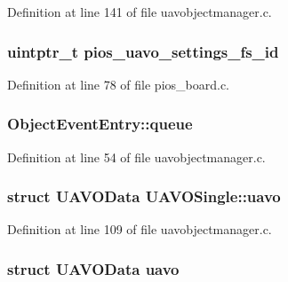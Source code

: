 Definition at line 141 of file uavobjectmanager.\-c.

\hypertarget{group___u_a_v_gab060f441dd600b08386c0ca1b487217a}{
\subsubsection[{pios\-\_\-uavo\-\_\-settings\-\_\-fs\-\_\-id}]{\setlength{\rightskip}{0pt plus 5cm}uintptr\-\_\-t pios\-\_\-uavo\-\_\-settings\-\_\-fs\-\_\-id}}\label{group___u_a_v_gab060f441dd600b08386c0ca1b487217a}


Definition at line 78 of file pios\-\_\-board.\-c.

\hypertarget{group___u_a_v_ga458a6b3068168aff7f61a922a5011673}{
\subsubsection[{queue}]{ Object\-Event\-Entry\-::queue}}\label{group___u_a_v_ga458a6b3068168aff7f61a922a5011673}


Definition at line 54 of file uavobjectmanager.\-c.

\hypertarget{group___u_a_v_gadc5ae49c5f1cc194e3df35a0652d9a13}{
\subsubsection[{uavo}]{\setlength{\rightskip}{0pt plus 5cm}struct {\bf U\-A\-V\-O\-Data} U\-A\-V\-O\-Single\-::uavo}}\label{group___u_a_v_gadc5ae49c5f1cc194e3df35a0652d9a13}


Definition at line 109 of file uavobjectmanager.\-c.

\hypertarget{group___u_a_v_gae867d32faead3f589ab1ceb9ecf3e3fd}{
\subsubsection[{uavo}]{\setlength{\rightskip}{0pt plus 5cm}struct {\bf U\-A\-V\-O\-Data} uavo}}\label{group___u_a_v_gae867d32faead3f589ab1ceb9ecf3e3fd}


